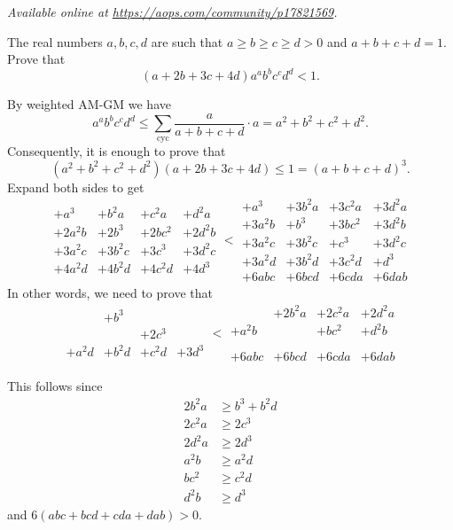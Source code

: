 \textsl{Available online at \url{https://aops.com/community/p17821569}.}
\begin{mdframed}[style=mdpurplebox,frametitle={Problem statement}]
The real numbers $a, b, c, d$
are such that $a\geq b\geq c\geq d>0$ and $a+b+c+d=1$.
Prove that
\[ (a+2b+3c+4d) a^a b^b c^c d^d < 1. \]
\end{mdframed}
By weighted AM-GM we have
\[ a^a b^b c^c d^d \le \sum_{\text{cyc}} \frac{a}{a+b+c+d} \cdot a
  = a^2+b^2+c^2+d^2. \]
Consequently, it is enough to prove that
\[ (a^2+b^2+c^2+d^2)(a+2b+3c+4d) \le 1 = (a+b+c+d)^3. \]
Expand both sides to get
\[
  \begin{array}{cccc}
    +a^3 &+ b^2a &+ c^2a & +d^2a \\
    +2a^2b &+ 2b^3 &+ 2bc^2  & +2d^2b \\
    +3a^2c & + 3b^2c & + 3c^3 & + 3d^2c \\
    +4a^2d &+ 4b^2d & + 4c^2d & + 4d^3
  \end{array}
  <
  \begin{array}{cccc}
    +a^3 &+ 3b^2a &+ 3c^2a & +3d^2a \\
    +3a^2b &+ b^3 &+ 3bc^2  & +3d^2b \\
    +3a^2c &+ 3b^2c &+ c^3 &+ 3d^2c \\
    +3a^2d &+ 3b^2d &+ 3c^2d &+ d^3 \\
    +6abc &+ 6bcd &+ 6cda &+ 6dab
  \end{array}
\]
In other words, we need to prove that
\[
  \begin{array}{cccc}
    & && \\
    &+ b^3 & & \\
    & & +2c^3 & \\
    +a^2d &+ b^2d & + c^2d & + 3d^3 \\
  \end{array}
  <
  \begin{array}{cccc}
    &+ 2b^2a &+ 2c^2a & +2d^2a \\
    +a^2b & &+ bc^2  & +d^2b \\
    &&& \\
    &&& \\
    +6abc &+ 6bcd &+ 6cda &+ 6dab
  \end{array}
\]

This follows since
\begin{align*}
  2b^2a &\ge b^3 + b^2d \\
  2c^2a &\ge 2c^3 \\
  2d^2a &\ge 2d^3  \\
  a^2b &\ge a^2d \\
  bc^2 &\ge c^2d  \\
  d^2b &\ge d^3
\end{align*}
and $6(abc+bcd+cda+dab) > 0$.

